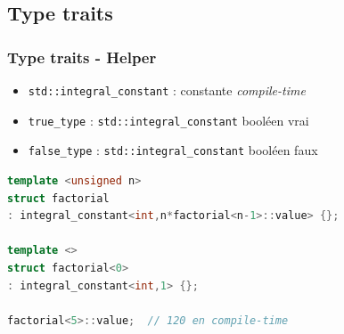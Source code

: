 \documentclass[C++.tex]{subfiles}
\begin{document}
\subsection*{Type traits}
\begin{frame}[fragile]
	\frametitle{Type traits - Helper}
	\begin{itemize}
		\item \lstinline|std::integral_constant| : constante \textit{compile-time}
		\item \lstinline|true_type| : \lstinline|std::integral_constant| booléen vrai
		\item \lstinline|false_type| : \lstinline|std::integral_constant| booléen faux
	\end{itemize}

	\begin{lstlisting}[language=C++]
template <unsigned n>
struct factorial 
: integral_constant<int,n*factorial<n-1>::value> {};

template <>
struct factorial<0> 
: integral_constant<int,1> {};

factorial<5>::value;  // 120 en compile-time\end{lstlisting}
\end{frame}
\end{document}
